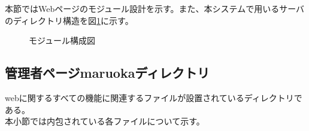 \documentclass[a4j]{jarticle}
\begin{document}
本節ではWebページのモジュール設計を示す。また、本システムで用いるサーバのディレクトリ構造を図\ref {tab:oonishimoj}に示す。

\begin{figure}[H]
\begin{center}
\caption{モジュール構成図}
\label{tab:oonishimoj}
\end{center}
\end{figure}
\subsection{管理者ページmaruokaディレクトリ}
webに関するすべての機能に関連するファイルが設置されているディレクトリである。\\
本小節では内包されている各ファイルについて示す。
\end{document}
